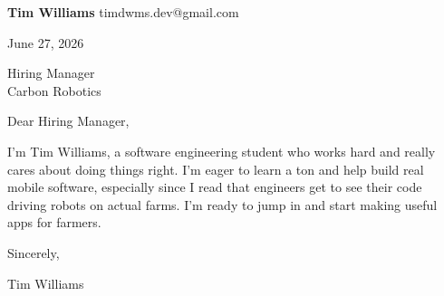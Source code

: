 \documentclass[12pt]{article}
\begin{document}
\textbf{Tim Williams} \hfill timdwms.dev@gmail.com

\vspace{1em}

June 27, 2026

\vspace{1em}

Hiring Manager \\
Carbon Robotics

\vspace{1em}

Dear Hiring Manager,

I'm Tim Williams, a software engineering student who works hard and really cares about doing things right. I'm eager to learn a ton and help build real mobile software, especially since I read that engineers get to see their code driving robots on actual farms. I'm ready to jump in and start making useful apps for farmers.

\vspace{1em}

Sincerely,

\vspace{2em}

Tim Williams
\end{document}
